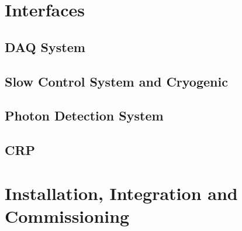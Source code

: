 


\section{Interfaces}
\label{sec:fddp-tpc-elec-intfc}



\subsection{DAQ System}
\label{sec:fddp-tpc-elec-intfc-daq}

\subsection{Slow Control System and Cryogenic}
\label{sec:fddp-tpc-elec-intfc-sc}

\subsection{Photon Detection System}
\label{sec:fddp-tpc-elec-intfc-pmt}

\subsection{CRP}
\label{sec:fddp-tpc-elec-intfc-crp}







\section{Installation, Integration and Commissioning}
\label{sec:fddp-tpc-elec-install}

